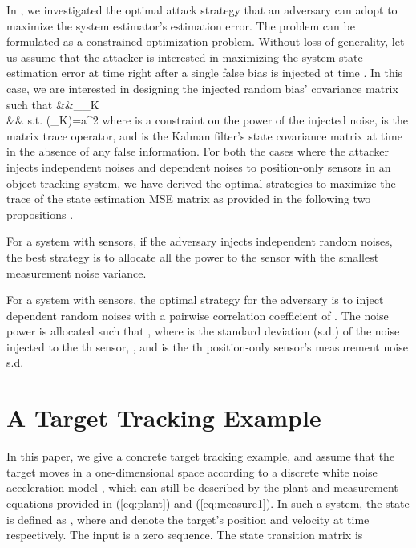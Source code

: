 \documentclass{article}
\begin{document}
In \cite{lu&niu:fusion14}, we investigated the optimal attack strategy that an adversary can adopt to maximize the system estimator's estimation error. The problem can be formulated as a constrained optimization problem. Without loss of generality,  let us assume that the attacker is interested in maximizing the system state  estimation error at time  right after a single false bias is injected at time . In this case, we are interested in designing the injected random bias' covariance matrix such that 
\beqa 
	&&\max_{{\bf \Sigma}_K}  \nn\\ 
	&& s.t. \;\;\; ({\bf \Sigma}_K)=a^2
	\label{eq:max_trace}
\eeqa
where  is a constraint on the power of the injected noise,  is the matrix trace operator, and  is the Kalman filter's state   covariance matrix at time  in the absence of any false information. For both the cases where the attacker injects independent noises and dependent noises to position-only sensors in an object tracking system, we have derived the optimal strategies to  maximize the trace of the state estimation MSE matrix  as provided in the following two propositions \cite{lu&niu:fusion14}. 
\begin{proposition}
\label{pro:attack-ind}
For a system with  sensors, if the adversary injects independent random noises, the best strategy  is to allocate all the power to the sensor with the smallest measurement noise variance.
\end{proposition}

\begin{proposition}
\label{pro:attack}
	For a system with  sensors, the optimal strategy for the adversary is to inject dependent random noises with a pairwise correlation coefficient of . The noise  power is allocated such that , where  is the standard deviation (s.d.) of the noise injected to the th sensor,  , and  is the th position-only sensor's measurement noise s.d. 
\end{proposition}
\section{A Target Tracking Example }

In this paper, we give a concrete target tracking example, and assume that the target moves in a one-dimensional space according to a discrete white noise acceleration model \cite{YBS:book}, which can still be described by the plant and measurement equations provided in (\ref{eq:plant}) and (\ref{eq:measure1}). 
In such a system, the state is defined as , where  and  denote the target's position and velocity at time  respectively.  The input  is a zero sequence. 
The state transition matrix is 
\end{document}

